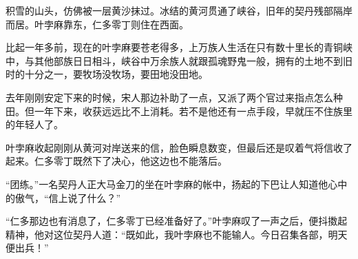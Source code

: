 积雪的山头，仿佛被一层黄沙抹过。冰结的黄河贯通了峡谷，旧年的契丹残部隔岸而居。叶孛麻靠东，仁多零丁则住在西面。

比起一年多前，现在的叶孛麻要苍老得多，上万族人生活在只有数十里长的青铜峡中，与其他部族日日相斗，峡谷中万余族人就跟孤魂野鬼一般，拥有的土地不到旧时的十分之一，要牧场没牧场，要田地没田地。

去年刚刚安定下来的时候，宋人那边补助了一点，又派了两个官过来指点怎么种田。但一年下来，收获远远比不上消耗。若不是他还有一点手段，早就压不住族里的年轻人了。

叶孛麻收起刚刚从黄河对岸送来的信，脸色瞬息数变，但最后还是叹着气将信收了起来。仁多零丁既然下了决心，他这边也不能落后。

“团练。”一名契丹人正大马金刀的坐在叶孛麻的帐中，扬起的下巴让人知道他心中的傲气，“信上说了什么？”

“仁多那边也有消息了，仁多零丁已经准备好了。”叶孛麻叹了一声之后，便抖擞起精神，他对这位契丹人道：“既如此，我叶孛麻也不能输人。今日召集各部，明天便出兵！”
